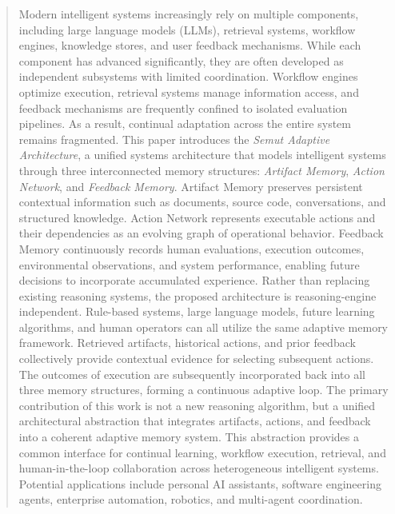 \begin{abstract}
Modern intelligent systems increasingly rely on multiple components, including large language models (LLMs), retrieval systems, workflow engines, knowledge stores, and user feedback mechanisms. While each component has advanced significantly, they are often developed as independent subsystems with limited coordination. Workflow engines optimize execution, retrieval systems manage information access, and feedback mechanisms are frequently confined to isolated evaluation pipelines. As a result, continual adaptation across the entire system remains fragmented.
This paper introduces the \emph{Semut Adaptive Architecture}, a unified systems architecture that models intelligent systems through three interconnected memory structures: \emph{Artifact Memory}, \emph{Action Network}, and \emph{Feedback Memory}. Artifact Memory preserves persistent contextual information such as documents, source code, conversations, and structured knowledge. Action Network represents executable actions and their dependencies as an evolving graph of operational behavior. Feedback Memory continuously records human evaluations, execution outcomes, environmental observations, and system performance, enabling future decisions to incorporate accumulated experience.
Rather than replacing existing reasoning systems, the proposed architecture is reasoning-engine independent. Rule-based systems, large language models, future learning algorithms, and human operators can all utilize the same adaptive memory framework. Retrieved artifacts, historical actions, and prior feedback collectively provide contextual evidence for selecting subsequent actions. The outcomes of execution are subsequently incorporated back into all three memory structures, forming a continuous adaptive loop.
The primary contribution of this work is not a new reasoning algorithm, but a unified architectural abstraction that integrates artifacts, actions, and feedback into a coherent adaptive memory system. This abstraction provides a common interface for continual learning, workflow execution, retrieval, and human-in-the-loop collaboration across heterogeneous intelligent systems. Potential applications include personal AI assistants, software engineering agents, enterprise automation, robotics, and multi-agent coordination.
\end{abstract}